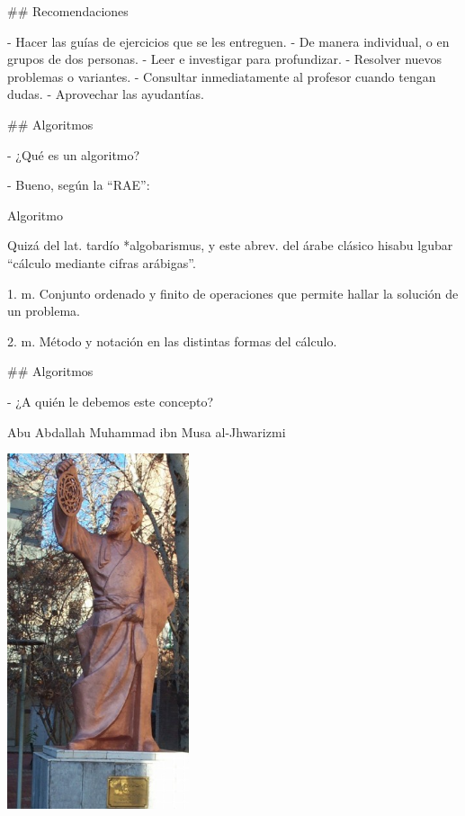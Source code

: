 ## Recomendaciones

\vfill

- Hacer las guías de ejercicios que se les entreguen.
    - De manera individual, o en grupos de dos personas.
- Leer e investigar para profundizar.
- Resolver nuevos problemas o variantes.
- Consultar inmediatamente al profesor cuando tengan dudas.
- Aprovechar las ayudantías.

\vfill

## Algoritmos

- ¿Qué es un algoritmo?

\pause

- Bueno, según la ``RAE'':

\begin{block}{Algoritmo}

    \justifying
 \begin{small}
 Quizá del lat. tardío *algobarismus, y este abrev. del árabe clásico hisabu lgubar ``cálculo mediante cifras arábigas''.\\[1em]
 \end{small}

 \alert<3->{1. m. Conjunto ordenado y finito de operaciones que permite hallar la solución de un problema.\\[1em]}

 2. m. Método y notación en las distintas formas del cálculo.

\end{block}


## Algoritmos

\bgncolumns


\vspace{-1em}

- ¿A quién le debemos este concepto?

\pause

\bgnblockgood[wd=.8\textwidth]
Abu Abdallah Muhammad ibn Musa al-Jhwarizmi 
\trmblockgood

\includegraphics[width=0.4\textwidth,valign=t]{img/Khwarizmi_Amirkabir_University_of_Technology.png}
\trmcolumns

